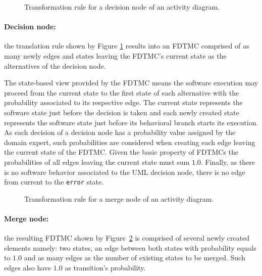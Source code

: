 \begin{figure}[h!]
\begin{center}
\begin{tikzpicture}
    
    \end{tikzpicture}
\end{center}
\caption{Transformation rule for a decision node of an activity diagram.}
\label{fig:transDecis_AD}
\end{figure}

\paragraph{Decision node: \label{par:decisionNodeTransformation}}
the translation rule shown by Figure \ref{fig:transDecis_AD} results
into an FDTMC comprised of as many newly edges and states leaving the FDTMC's
current state as the alternatives of the decision node. 

The state-based view provided by the FDTMC means the software execution may
proceed from the current state to the first state of each alternative with the
probability associated to its respective edge. The current state represents the
software state just before the decision is taken and each newly created state
represents the software state just before its behavioral branch starts its
execution. As each decision of a decision node has a probability value assigned
by the domain expert, such probabilities are considered when creating each edge
leaving the current state of the FDTMC. Given the basic property of FDTMCs the
probabilities of all edges leaving the current state must sum $1.0$. Finally,
as there is no software behavior associated to the UML decision node, there is
no edge from current to the \texttt{error} state. 

\begin{figure}[h!]
\begin{center}
\begin{tikzpicture}
    \centering
    
\end{tikzpicture}
\end{center}
\caption{Transformation rule for a merge node of an activity diagram.}
\label{fig:transMerge_AD}
\end{figure}

\paragraph{Merge node: \label{par:mergeNodeTransformation}} 
the resulting FDTMC shown by Figure~\ref{fig:transMerge_AD} is comprised of
several newly created elements namely: two states, an edge between both states
with probability equals to $1.0$ and as many edges as the number of existing
states to be merged. Such edges also have $1.0$ as transition's probability. 

